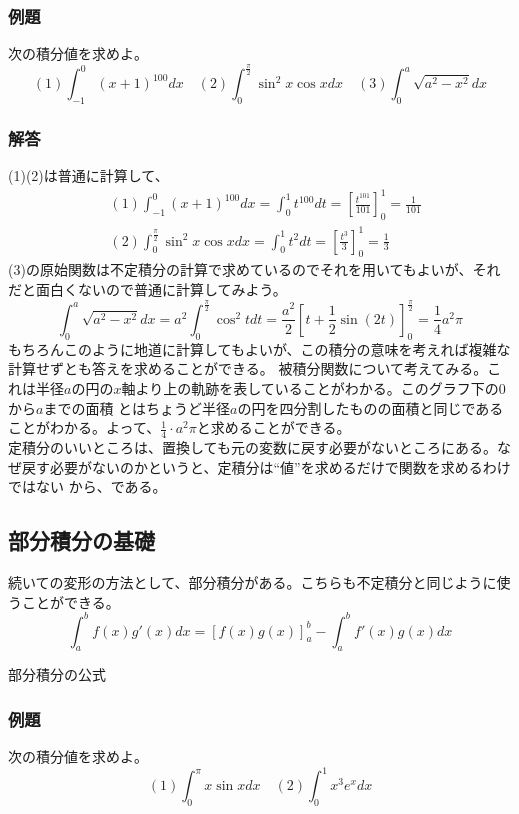 \documentclass[a4j,dvipdfmx]{jsarticle}
\begin{document}
\subsubsection*{例題}
次の積分値を求めよ。
\begin{equation*}
    (1)\int_{-1}^0 (x+1)^{100}dx\quad(2)\int_0^{\frac{\pi}{2}}\sin^2x\cos xdx \quad(3)\int_0^a\sqrt{a^2-x^2}dx
\end{equation*} 
\subsubsection*{解答}
(1)(2)は普通に計算して、
\begin{align*}
    &(1)\int_{-1}^0(x+1)^{100}dx=\int_0^1t^{100}dt=\left[\frac{t^{101}}{101}\right]_0^1=\frac{1}{101}\\
    &(2)\int_0^{\frac{\pi}{2}}\sin^2x\cos xdx=\int_0^1 t^2dt=\left[\frac{t^3}{3}\right]_0^1=\frac{1}{3}
\end{align*}
(3)の原始関数は不定積分の計算で求めているのでそれを用いてもよいが、それだと面白くないので普通に計算してみよう。
\begin{equation*}
    \int_0^a\sqrt{a^2-x^2}dx=a^2\int_0^{\frac{\pi}{2}}\cos^2 tdt=\frac{a^2}{2}\left[t+\frac{1}{2}\sin(2t)\right]_0^{\frac{\pi}{2}}=\frac{1}{4}a^2\pi
\end{equation*}
もちろんこのように地道に計算してもよいが、この積分の意味を考えれば複雑な計算せずとも答えを求めることができる。
被積分関数について考えてみる。これは半径$a$の円の$x$軸より上の軌跡を表していることがわかる。このグラフ下の$0$から$a$までの面積
とはちょうど半径$a$の円を四分割したものの面積と同じであることがわかる。よって、$\frac{1}{4}\cdot a^2\pi$と求めることができる。\\

定積分のいいところは、置換しても元の変数に戻す必要がないところにある。なぜ戻す必要がないのかというと、定積分は``値''を求めるだけで関数を求めるわけではない
から、である。
\newpage
\subsection{部分積分の基礎}
続いての変形の方法として、部分積分がある。こちらも不定積分と同じように使うことができる。
\begin{equation*}
    \int_a^b f(x)g'(x)dx=\left[f(x)g(x)\right]_a^b-\int_a^b f'(x)g(x)dx
\end{equation*}
\centerline{部分積分の公式}
\subsubsection*{例題}
次の積分値を求めよ。
\begin{equation*}
    (1)\int_0^{\pi}x\sin xdx\quad (2)\int_0^1x^3e^xdx
\end{equation*}
\end{document}
